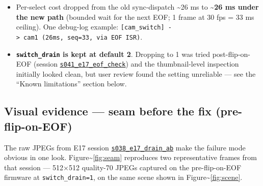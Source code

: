 \begin{itemize}
\tightlist
\item
  Per-select cost dropped from the old sync-dispatch \textasciitilde26
  ms to \textbf{\textasciitilde26 ms under the new path} (bounded wait
  for the next EOF; 1 frame at 30 fps = 33 ms ceiling). One debug-log
  example:
  \texttt{{[}cam\_switch{]}\ -\textgreater{}\ cam1\ (26ms,\ seq=33,\ via\ EOF\ ISR)}.
\item
  \textbf{\texttt{switch\_drain} is kept at default 2}. Dropping to 1
  was tried post-flip-on-EOF (session
  \href{../experiments/s041_e17_eof_check/}{\texttt{s041\_e17\_eof\_check}})
  and the thumbnail-level inspection initially looked clean, but user
  review found the setting unreliable --- see the ``Known limitations''
  section below.
\end{itemize}

\subsection{Visual evidence --- seam before the fix
(pre-flip-on-EOF)}\label{visual-evidence-seam-before-the-fix-pre-flip-on-eof}

The raw JPEGs from E17 session
\href{../experiments/s038_e17_drain_ab/}{\texttt{s038\_e17\_drain\_ab}}
make the failure mode obvious in one look.
Figure\textasciitilde{}\ref{fig:seam} reproduces two representative
frames from that session --- 512×512 quality-70 JPEGs captured on the
pre-flip-on-EOF firmware at \texttt{switch\_drain=1}, on the same scene
shown in Figure\textasciitilde{}\ref{fig:scene}.

